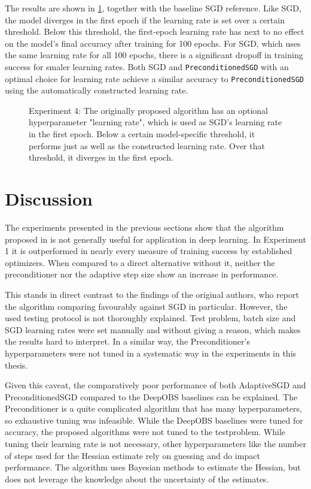 \documentclass[twoside,12pt,a4paper]{report}
\begin{document}
The results are shown in \ref{fig:exp_lr_sens}, together with the baseline SGD reference.
Like SGD, the model diverges in the first epoch if the learning rate is set over a certain threshold. Below this threshold, the first-epoch learning rate has next to no effect on the model's final accuracy after training for 100 epochs. For SGD, which uses the same learning rate for all 100 epochs, there is a significant dropoff in training success for smaler learning rates.
Both SGD and \verb|PreconditionedSGD| with an optimal choice for learning rate achieve a similar accuracy to \verb|PreconditionedSGD| using the automatically constructed learning rate. 

\begin{figure}
	\centering \hspace{-1,5cm}
	
	\caption{Experiment 4: The originally proposed algorithm has an optional hyperparameter "learning rate", which is used as SGD's learning rate in the first epoch. Below a certain model-specific threshold, it performs just as well as the constructed learning rate. Over that threshold, it diverges in the first epoch. }
	\label{fig:exp_lr_sens}
\end{figure}



\section{Discussion}
The experiments presented in the previous sections show that the algorithm proposed in \cite{roos2019active} is not generally useful for application in deep learning. In Experiment 1 it is outperformed in nearly every measure of training success by established optimizers. When compared to a direct alternative without it, neither the preconditioner nor the adaptive step size show an increase in performance.

This stands in direct contrast to the findings of the original authors, who report the algorithm comparing favourably against SGD in particular. However, the used testing protocol is not thoroughly explained. Test problem, batch size and SGD learning rates were set manually and without giving a reason, which makes the results hard to interpret. In a similar way, the Preconditioner's hyperparameters were not tuned in a systematic way in the experiments in this thesis.

Given this caveat, the comparatively poor performance of both AdaptiveSGD and PreconditionedSGD compared to the DeepOBS baselines can be explained. The Preconditioner is a quite complicated algorithm that has many hyperparameters, so exhaustive tuning was infeasible. While the DeepOBS baselines were tuned for accuracy, the proposed algorithms were not tuned to the testproblem. While tuning their learning rate is not necessary, other hyperparameters like the number of steps used for the Hessian estimate rely on guessing and do impact performance. The algorithm uses Bayesian methods to estimate the Hessian, but does not leverage the knowledge about the uncertainty of the estimates.
\end{document}

